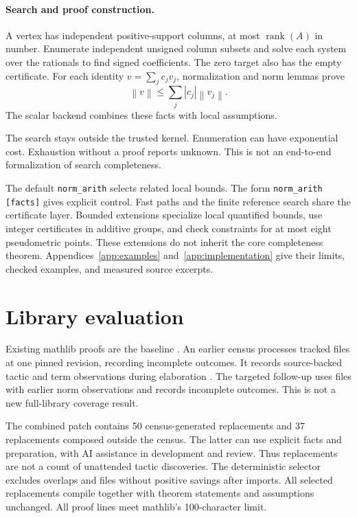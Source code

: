 \documentclass{article}
\newcommand{\norm}[1]{\left\lVert#1\right\rVert}
\newcommand{\NA}{\texttt{norm\_arith}}
\begin{document}
\paragraph{Search and proof construction.}\label{sec:procedure}
A vertex has independent positive-support columns, at most $\operatorname{rank}(A)$ in number.
Enumerate independent unsigned column subsets and solve each system over the rationals to find signed coefficients.
The zero target also has the empty certificate.
For each identity $v=\sum_j c_jv_j$, normalization and norm lemmas prove
\begin{equation}\label{eq:certificate}
 \norm{v}\le\sum_j |c_j|\norm{v_j}.
\end{equation}
The scalar backend combines these facts with local assumptions.

The search stays outside the trusted kernel.
Enumeration can have exponential cost.
Exhaustion without a proof reports unknown.
This is not an end-to-end formalization of search completeness.

The default \NA{} selects related local bounds.
The form \texttt{norm\_arith [facts]} gives explicit control.
Fast paths and the finite reference search share the certificate layer.
Bounded extensions specialize local quantified bounds, use integer certificates in additive groups, and check constraints for at most eight pseudometric points.
These extensions do not inherit the core completeness theorem.
Appendices~\ref{app:examples} and~\ref{app:implementation} give their limits, checked examples, and measured source excerpts.

\section{Library evaluation}
\label{sec:evaluation}
Existing mathlib proofs are the baseline \citep{mathlib}.
An earlier census processes \CensusFiles{} tracked files at one pinned revision, recording \CensusFailed{} incomplete outcomes.
It records source-backed tactic and term observations during elaboration \citep{leaninfotree}.
The targeted follow-up uses \FollowupFiles{} files with earlier norm observations and records \FollowupFailed{} incomplete outcomes.
This is not a new full-library coverage result.

The combined patch contains 50 census-generated replacements and 37 replacements composed outside the census.
The latter can use explicit facts and preparation, with AI assistance in development and review.
Thus \PatchReplacements{} replacements are not a count of unattended tactic discoveries.
The deterministic selector excludes overlaps and files without positive savings after imports.
All selected replacements compile together with theorem statements and assumptions unchanged.
All proof lines meet mathlib's 100-character limit.
\end{document}
